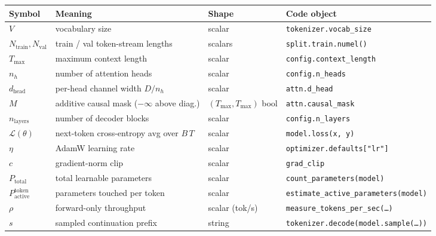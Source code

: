 \medskip
\noindent
\begin{tabular}{p{} p{} p{} p{}}
\toprule
\textbf{Symbol} & \textbf{Meaning} & \textbf{Shape} & \textbf{Code object} \\
\midrule
$V$                            & vocabulary size                          & scalar          & \texttt{tokenizer.vocab\_size} \\
$N_{\text{train}}, N_{\text{val}}$ & train / val token-stream lengths       & scalars         & \texttt{split.train.numel()} \\
$T_{\max}$                     & maximum context length                   & scalar          & \texttt{config.context\_length} \\
$n_h$                          & number of attention heads                & scalar          & \texttt{config.n\_heads} \\
$d_{\text{head}}$              & per-head channel width $D / n_h$         & scalar          & \texttt{attn.d\_head} \\
$M$                            & additive causal mask ($-\infty$ above diag.) & $(T_{\max}, T_{\max})$ bool & \texttt{attn.causal\_mask} \\
$n_{\text{layers}}$            & number of decoder blocks                 & scalar          & \texttt{config.n\_layers} \\
$\mathcal{L}(\theta)$          & next-token cross-entropy avg over $B\,T$ & scalar          & \texttt{model.loss(x, y)} \\
$\eta$                         & AdamW learning rate                      & scalar          & \texttt{optimizer.defaults["lr"]} \\
$c$                            & gradient-norm clip                       & scalar          & \texttt{grad\_clip} \\
$P_{\text{total}}$             & total learnable parameters               & scalar          & \texttt{count\_parameters(model)} \\
$P^{\text{token}}_{\text{active}}$ & parameters touched per token         & scalar          & \texttt{estimate\_active\_parameters(model)} \\
$\rho$                         & forward-only throughput                   & scalar (tok/s) & \texttt{measure\_tokens\_per\_sec(\dots)} \\
$s$                            & sampled continuation prefix              & string          & \texttt{tokenizer.decode(model.sample(\dots))} \\
\bottomrule
\end{tabular}
\medskip

